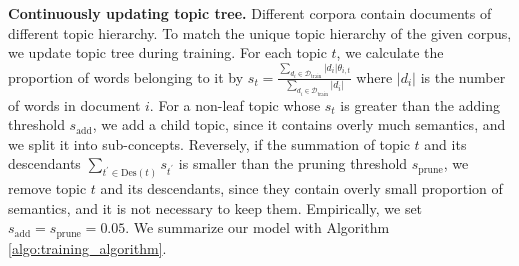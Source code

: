 \textbf{Continuously updating topic tree.} Different corpora contain documents of different topic hierarchy. To match the unique topic hierarchy of the given corpus, we update topic tree during training. For each topic $ t $, we calculate the proportion of words belonging to it by $ s_t=\frac{\sum_{d_i\in\mathcal{D}_{\text{train}}}|d_i|\theta_{i,t}}{\sum_{d_i\in\mathcal{D}_{\text{train}}}|d_i|} $ where $ |d_i| $ is the number of words in document $ i $. For a non-leaf topic whose $ s_t $ is greater than the adding threshold $ s_{\text{add}} $, we add a child topic, since it contains overly much semantics, and we split it into sub-concepts. Reversely, if the summation of topic $ t $ and its descendants $ \sum_{t^\prime\in\text{Des}(t)}s_{t^\prime} $ is smaller than the pruning threshold $ s_{\text{prune}} $, we remove topic $ t $ and its descendants, since they contain overly small proportion of semantics, and it is not necessary to keep them. Empirically, we set $ s_{\text{add}}=s_{\text{prune}}=0.05 $.  We summarize our model with Algorithm \ref{algo:training_algorithm}.